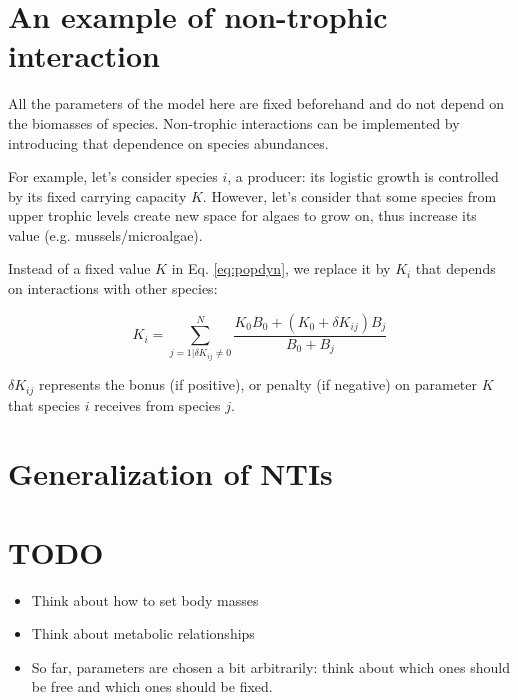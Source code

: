 \documentclass[a4paper,11pt]{article}
\begin{document}
  
  \section{An example of non-trophic interaction}
    All the parameters of the model here are fixed beforehand and do not depend 
on the biomasses of species. Non-trophic interactions can be implemented by 
introducing that dependence on species abundances.
    
    For example, let's consider species $i$, a producer: its logistic growth is 
controlled by its fixed carrying capacity $K$. However, let's consider that some 
species from upper trophic levels create new space for algaes to grow on, thus 
increase its value (e.g. mussels/microalgae). 
    
    Instead of a fixed value $K$ in Eq. \ref{eq:popdyn}, we replace it by 
$K_{i}$ that depends on interactions with other species: 
    
    \begin{equation}
      K_{i} = \sum_{j=1|\delta K_{ij}\neq0}^{N} \frac{ K_0 B_0 + (K_0 + \delta K_{ij}) B_j }{ B_0 + B_j }
    \end{equation}
    
    $\delta K_{ij}$ represents the bonus (if positive), or penalty (if negative) 
on parameter $K$ that species $i$ receives from species $j$. 
    
  
  \section{Generalization of NTIs}
    
    
    
  \newpage
  \section*{TODO}
    \begin{itemize}
      \item Think about how to set body masses
      \item Think about metabolic relationships
      \item So far, parameters are chosen a bit arbitrarily: think about which 
            ones should be free and which ones should be fixed.
    \end{itemize}
  
  
  \newpage
  \begin{footnotesize}
    \printbibliography
  \end{footnotesize}
  
\end{document}
